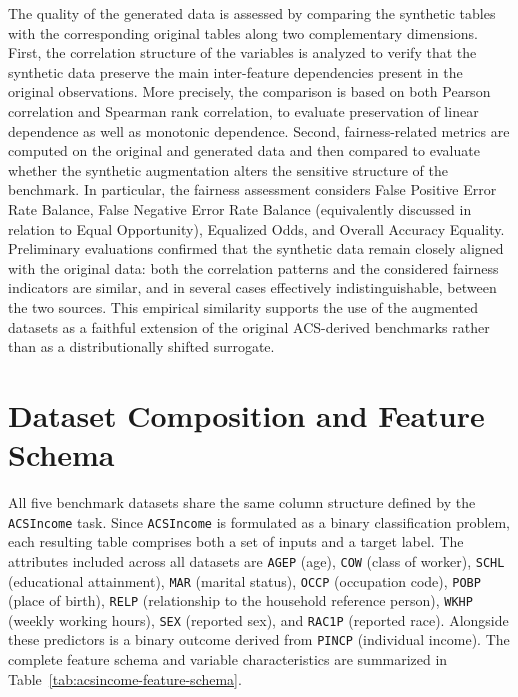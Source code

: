 The quality of the generated data is assessed by comparing the synthetic tables with the corresponding original tables along two complementary dimensions. First, the correlation structure of the variables is analyzed to verify that the synthetic data preserve the main inter-feature dependencies present in the original observations. More precisely, the comparison is based on both Pearson correlation and Spearman rank correlation, to evaluate preservation of linear dependence as well as monotonic dependence. Second, fairness-related metrics are computed on the original and generated data and then compared to evaluate whether the synthetic augmentation alters the sensitive structure of the benchmark. In particular, the fairness assessment considers False Positive Error Rate Balance, False Negative Error Rate Balance (equivalently discussed in relation to Equal Opportunity), Equalized Odds, and Overall Accuracy Equality. Preliminary evaluations confirmed that the synthetic data remain closely aligned with the original data: both the correlation patterns and the considered fairness indicators are similar, and in several cases effectively indistinguishable, between the two sources. This empirical similarity supports the use of the augmented datasets as a faithful extension of the original ACS-derived benchmarks rather than as a distributionally shifted surrogate.

\section{Dataset Composition and Feature Schema}
\label{sec:dataset-columns}

All five benchmark datasets share the same column structure defined by the \texttt{ACSIncome} task. Since \texttt{ACSIncome} is formulated as a binary classification problem, each resulting table comprises both a set of inputs and a target label. The attributes included across all datasets are \texttt{AGEP} (age), \texttt{COW} (class of worker), \texttt{SCHL} (educational attainment), \texttt{MAR} (marital status), \texttt{OCCP} (occupation code), \texttt{POBP} (place of birth), \texttt{RELP} (relationship to the household reference person), \texttt{WKHP} (weekly working hours), \texttt{SEX} (reported sex), and \texttt{RAC1P} (reported race). Alongside these predictors is a binary outcome derived from \texttt{PINCP} (individual income). The complete feature schema and variable characteristics are summarized in Table~\ref{tab:acsincome-feature-schema}.

